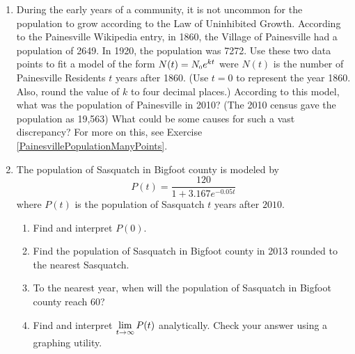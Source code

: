 \begin{enumerate}
\item  \label{PainesvillePopulationTwoPoint} During the early years of a community, it is not uncommon for the population to grow according to the Law of Uninhibited Growth.  According to the Painesville Wikipedia entry, in 1860, the Village of Painesville had a population of 2649.  In 1920, the population was 7272.  Use these two data points to fit a model of the form $N(t) = N_{\text{\tiny $0$}} e^{kt}$ were $N(t)$ is the number of Painesville Residents $t$ years after 1860.  (Use $t = 0$ to represent the year 1860.  Also, round the value of $k$ to four decimal places.)  According to this model, what was the population of Painesville in 2010?  (The 2010 census gave the population as 19,563) What could be some causes for such a vast discrepancy?  For more on this, see Exercise \ref{PainesvillePopulationManyPoints}.

\item  The population of Sasquatch in Bigfoot county is modeled by \[P(t) = \dfrac{120}{1 + 3.167e^{-0.05t}}\] where $P(t)$ is the population of Sasquatch $t$ years after $2010$.

\begin{enumerate}

\item  Find and interpret $P(0)$.

\item  Find the population of Sasquatch in Bigfoot county in 2013 rounded to the nearest Sasquatch.

\item  To the nearest year, when will the population of Sasquatch in Bigfoot county reach 60?  

\item   Find and interpret  $\displaystyle{\lim_{t \rightarrow \infty} P(t)}$ analytically. Check your answer using a graphing utility. 

\end{enumerate}

\setcounter{HW}{\value{enumi}}
\end{enumerate}


